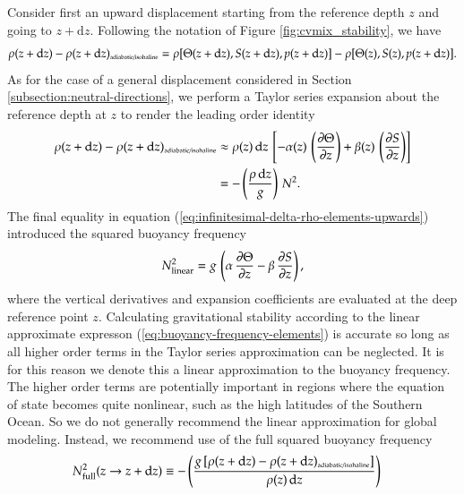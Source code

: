 Consider first an upward displacement starting from the reference
depth $z$ and going to $z+\mathrm{d}z$.  Following the notation of
Figure \ref{fig:cvmix_stability}, we have
\begin{equation}
\rho(z+\mathrm{d} z)  - \rho(z+\mathrm{d} z)_{\mbox{\tiny adiabatic/isohaline}}  
= 
 \rho[ \Theta(z + \mathrm{d} z), S(z + \mathrm{d} z), p(z + \mathrm{d} z)]
-
\rho[ \Theta(z), S(z), p(z + \mathrm{d}z)].
\end{equation}
As for the case of a general displacement considered in Section
\ref{subsection:neutral-directions}, we perform a Taylor series
expansion about the reference depth at $z$ to render the leading order
identity
\begin{equation}
\begin{split}
\rho(z+\mathrm{d} z)  - \rho(z+\mathrm{d} z)_{\mbox{\tiny adiabatic/isohaline}}  
&\approx 
  \rho(z) \, \mathrm{d}z \, \left[ 
   -\alpha(z) \, \left( \frac{\partial \Theta}{\partial z} \right )
 + \beta(z) \, \left( \frac{\partial S}{\partial z} \right) \right]
 \\
&= 
 -\left( \frac{\rho \, \mathrm{d}z}{g} \right) \, N^{2}.
\end{split}
\label{eq:infinitesimal-delta-rho-elements-upwards}
\end{equation}
The final equality in equation
(\ref{eq:infinitesimal-delta-rho-elements-upwards}) introduced the
squared buoyancy frequency
 \begin{equation}
 N^{2}_{\mbox{\scriptsize linear}} = g \, \left( \alpha \, \frac{\partial \Theta}{\partial z} 
                         - \beta  \, \frac{\partial S}{\partial z} \right),
\label{eq:buoyancy-frequency-elements}
\end{equation}
where the vertical derivatives and expansion coefficients are
evaluated at the deep reference point $z$.  Calculating gravitational
stability according to the linear approximate expresson
(\ref{eq:buoyancy-frequency-elements}) is accurate so long as all
higher order terms in the Taylor series approximation can be
neglected.  It is for this reason we denote this a linear
approximation to the buoyancy frequency.  The higher order terms are
potentially important in regions where the equation of state becomes
quite nonlinear, such as the high latitudes of the Southern Ocean.  So
we do not generally recommend the linear approximation for global
modeling.  Instead, we recommend use of the full squared buoyancy
frequency
\begin{equation}
\begin{split}
 N^{2}_{\mbox{\scriptsize full}}(z \rightarrow z+\mathrm{d}z) &\equiv 
 -\left( \frac{g \, [ \rho(z+\mathrm{d} z)  - \rho(z+\mathrm{d} z)_{\mbox{\tiny adiabatic/isohaline}} ] } {\rho(z) \, \mathrm{d}z} \right)
\end{split}
\label{eq:infinitesimal-delta-rho-elements-upwards-B}
\end{equation}

